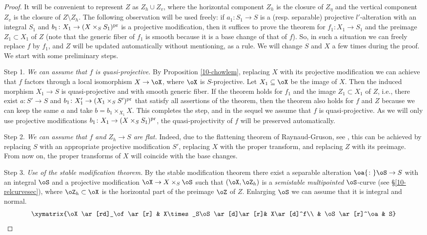 \documentclass[10pt]{../fichiers-configuration-latex/smfart}
\begin{document}
\begin{proof}
It will be convenient to represent $Z$ as $Z_h\cup Z_v$, where the horizontal component
$Z_h$ is the closure of $Z_\eta$ and the vertical component $Z_v$ is the closure of
$Z\setminus Z_h$. The following observation will be used freely: if $a_1{\colon}S_1\to S$
is a (resp. separable) projective $l'$-alteration with an integral $S_1$ and
$b_1{\colon}X_1\to(X\times_SS_1)^{\rm pr}$ is a projective modification, then
it suffices to prove the theorem for $f_1{\colon}X_1\to S_1$ and the preimage
$Z_1\subset X_1$ of $Z$ (note that the generic fiber of $f_1$ is smooth because
it is a base change of that of $f$). So, in such a situation we can freely replace
$f$ by $f_1$, and $Z$ will be updated automatically without mentioning, as a rule.
We will change $S$ and $X$ a few times during the proof. We start with some preliminary steps.

Step 1. {\it We can assume that $f$ is quasi-projective.} By Proposition \ref{10-chowlem},
replacing $X$ with its projective modification we can achieve that $f$ factors through
a local isomorphism $X\to\oX$, where $\oX$ is $S$-projective. Let $X_1\subseteq\oX$ be
the image of $X$. Then the induced morphism $X_1\to S$ is quasi-projective and with
smooth generic fiber. If the theorem holds for $f_1$ and the image $Z_1\subset X_1$
of $Z$, i.e., there exist $a{\colon}S'\to S$ and $b_1{\colon}X'_1\to(X_1\times_SS')^{\rm pr}$
that satisfy all assertions of the theorem, then the theorem also holds for $f$ and $Z$ because
we can keep the same $a$ and take $b=b_1\times_{X_1}X$. This completes the step, and in the
sequel we assume that $f$ is quasi-projective. As we will only use projective modifications
$b_1{\colon}X_1\to(X\times_SS_1)^{\rm pr}$, the quasi-projectivity of $f$ will be preserved
automatically.

Step 2. {\it We can assume that $f$ and $Z_h\to S$ are flat.} Indeed, due to the flattening
theorem of Raynaud-Gruson, see \cite[5.7.9]{Platification@Raynaud-Gruson}, this can be achieved
by replacing $S$ with an appropriate projective modification $S'$, replacing $X$ with the proper
transform, and replacing $Z$ with its preimage. From now on, the proper transforms of $X$ will
coincide with the base changes.

Step 3. {\it Use of the stable modification theorem.} By the stable modification theorem
\cite[1.5 and 1.1]{Temkin@stable} there exist a separable alteration $\oa{\colon}\oS\to S$
with an integral $\oS$ and a projective modification $\oX\to X\times_S\oS$ such that
$(\oX,\oZ_h)$ is a {\em semistable multipointed} $\oS$-curve (see \S\ref{10-relcurvesec}),
where $\oZ_h\subset\oX$ is the horizontal part of the preimage $\oZ$ of $Z$. Enlarging
$\oS$ we can assume that it is integral and normal.
\begin{equation*}
\xymatrix{\oX \ar[rd]_\of\ar[r] & X\times_S\oS \ar[d]\ar[r]& X\ar[d]^f\\
& \oS \ar[r]^\oa & S}
\end{equation*}


\end{proof}
\end{document}
